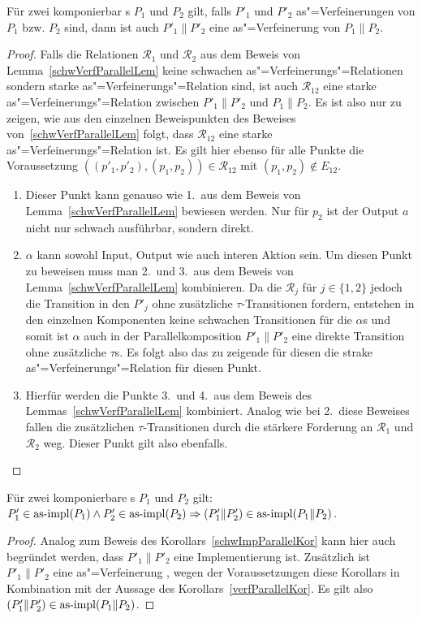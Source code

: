 \begin{Kor}
  \label{verfParallelKor}
  Für zwei komponierbar \MEIO{}s $P_1$ und $P_2$ gilt, falls $P'_1$ und $P'_2$
  as"=Verfeinerungen von $P_1$ bzw. $P_2$ sind, dann ist auch $P'_1\|P'_2$ eine
  as"=Verfeinerung von $P_1\|P_2$.
\end{Kor}
\begin{proof}
  Falls die Relationen $\mathcal{R}_1$ und $\mathcal{R}_2$ aus dem Beweis von
  Lemma~\ref{schwVerfParallelLem} keine schwachen as"=Verfeinerungs"=Relationen
  sondern starke as"=Verfeinerungs"=Relation sind, ist auch $\mathcal{R}_{12}$
  eine starke as"=Verfeinerungs"=Relation zwischen $P'_1\|P'_2$ und $P_1\|P_2$.
  Es ist also nur zu zeigen, wie aus den einzelnen Beweispunkten des Beweises
  von~\ref{schwVerfParallelLem} folgt, dass $\mathcal{R}_{12}$ eine starke
  as"=Verfeinerungs"=Relation ist. Es gilt hier ebenso für alle Punkte die
  Voraussetzung $((p'_1,p'_2),(p_1,p_2))\in\mathcal{R}_{12}$ mit
  $(p_1,p_2)\notin E_{12}$.
  \begin{enumerate}
    \item Dieser Punkt kann genauso wie 1.\ aus dem Beweis von
      Lemma~\ref{schwVerfParallelLem} bewiesen werden. Nur für $p_2$ ist der
      Output $a$ nicht nur schwach ausführbar, sondern direkt.
    \item $\alpha$ kann sowohl Input, Output wie auch interen Aktion sein. Um
      diesen Punkt zu beweisen muss man 2.\ und 3.\ aus dem Beweis von
      Lemma~\ref{schwVerfParallelLem} kombinieren. Da die $\mathcal{R}_j$ für
      $j\in\{1,2\}$ jedoch die Transition in den $P'_j$ ohne zusätzliche
      $\tau$-Transitionen fordern, entstehen in den einzelnen Komponenten keine
      schwachen Transitionen für die $\alpha$s und somit ist $\alpha$ auch in
      der Parallelkomposition $P'_1\|P'_2$ eine direkte Transition ohne
      zusätzliche $\tau$s. Es folgt also das zu zeigende für diesen die strake
      as"=Verfeinerungs"=Relation für diesen Punkt.
    \item Hierfür werden die Punkte 3.\ und 4.\ aus dem Beweis des
      Lemmas~\ref{schwVerfParallelLem} kombiniert. Analog wie bei 2.\ diese
      Beweises fallen die zusätzlichen $\tau$-Transitionen durch die stärkere
      Forderung an $\mathcal{R}_1$ und $\mathcal{R}_2$ weg. Dieser Punkt gilt
      also ebenfalls.
  \end{enumerate}
\end{proof}

\begin{Kor}
  Für zwei komponierbare \MEIO{}s $P_1$ und $P_2$ gilt:
  $P'_1\in\mathrm{as}\text{-}\mathrm{impl} (P_1) \land P'_2 \in\mathrm{as}\text{-}\mathrm{impl} (P_2) \Rightarrow (P'_1\|P'_2)
  \in\mathrm{as}\text{-}\mathrm{impl} (P_1\|P_2)$.
\end{Kor}
\begin{proof}
  Analog zum Beweis des Korollars~\ref{schwImpParallelKor} kann hier auch
  begründet werden, dass $P'_1\|P'_2$ eine Implementierung ist. Zusätzlich
  ist $P'_1\|P'_2$ eine as"=Verfeinerung , wegen der Voraussetzungen diese
  Korollars in Kombination mit der Aussage des Korollars~\ref{verfParallelKor}.
  Es gilt also $(P'_1\|P'_2)\in\mathrm{as}\text{-}\mathrm{impl} (P_1\|P_2)$.
\end{proof}

